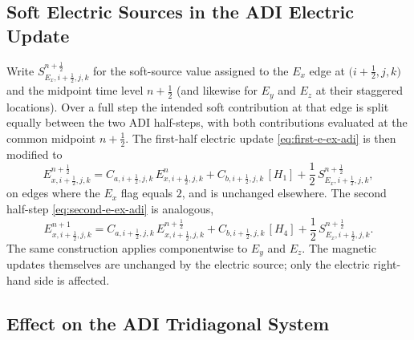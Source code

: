 \documentclass{article}
\numberwithin{equation}{section}
\numberwithin{figure}{section}
\begin{document}
\subsection{Soft Electric Sources in the ADI Electric Update}

Write $S_{E_x,i+\tfrac12,j,k}^{n+\frac12}$ for the soft-source value assigned to the $E_x$ edge at $\bigl(i+\tfrac12,j,k\bigr)$ and the midpoint time level $n+\tfrac12$ (and likewise for $E_y$ and $E_z$ at their staggered locations). Over a full step the intended soft contribution at that edge is split equally between the two ADI half-steps, with both contributions evaluated at the common midpoint $n+\tfrac12$. The first-half electric update \eqref{eq:first-e-ex-adi} is then modified to
\begin{equation}\label{eq:adi-ex-soft-unnormalized}
    E_{x,i+\tfrac12,j,k}^{n+\frac12}
    = C_{a,i+\tfrac12,j,k}\,E_{x,i+\tfrac12,j,k}^{n}
    + C_{b,i+\tfrac12,j,k}\,[H_1]
    + \frac12\,S_{E_x,i+\tfrac12,j,k}^{n+\frac12},
\end{equation}
on edges where the $E_x$ flag equals $2$, and is unchanged elsewhere. The second half-step \eqref{eq:second-e-ex-adi} is analogous,
\begin{equation}
    E_{x,i+\tfrac12,j,k}^{n+1}
    = C_{a,i+\tfrac12,j,k}\,E_{x,i+\tfrac12,j,k}^{n+\frac12}
    + C_{b,i+\tfrac12,j,k}\,[H_4]
    + \frac12\,S_{E_x,i+\tfrac12,j,k}^{n+\frac12}.
\end{equation}
The same construction applies componentwise to $E_y$ and $E_z$. The magnetic updates themselves are unchanged by the electric source; only the electric right-hand side is affected.

\subsection{Effect on the ADI Tridiagonal System}
\end{document}

